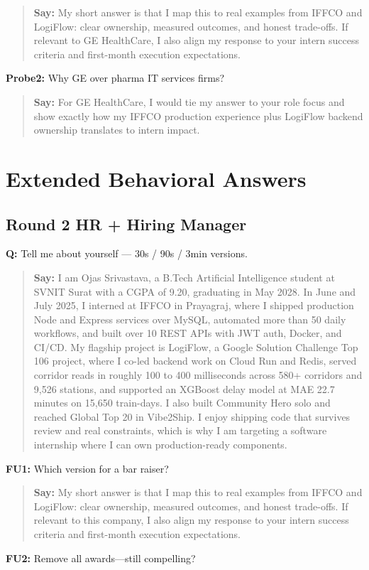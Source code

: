 \documentclass[9pt,a4paper]{article}
\begin{document}
\begin{quote}\small\textbf{Say:} My short answer is that I map this to real examples from IFFCO and LogiFlow: clear ownership, measured outcomes, and honest trade-offs. If relevant to GE HealthCare, I also align my response to your intern success criteria and first-month execution expectations.\end{quote}
\vspace{2mm}
\textbf{Probe2:} Why GE over pharma IT services firms?

\begin{quote}\small\textbf{Say:} For GE HealthCare, I would tie my answer to your role focus and show exactly how my IFFCO production experience plus LogiFlow backend ownership translates to intern impact.\end{quote}
\vspace{2mm}
\newpage\section{Extended Behavioral Answers}
\subsection{Round 2 HR + Hiring Manager}
\textbf{Q:} Tell me about yourself --- 30s / 90s / 3min versions.

\begin{quote}\small\textbf{Say:} I am Ojas Srivastava, a B.Tech Artificial Intelligence student at SVNIT Surat with a CGPA of 9.20, graduating in May 2028. In June and July 2025, I interned at IFFCO in Prayagraj, where I shipped production Node and Express services over MySQL, automated more than 50 daily workflows, and built over 10 REST APIs with JWT auth, Docker, and CI/CD. My flagship project is LogiFlow, a Google Solution Challenge Top 106 project, where I co-led backend work on Cloud Run and Redis, served corridor reads in roughly 100 to 400 milliseconds across 580+ corridors and 9,526 stations, and supported an XGBoost delay model at MAE 22.7 minutes on 15,650 train-days. I also built Community Hero solo and reached Global Top 20 in Vibe2Ship. I enjoy shipping code that survives review and real constraints, which is why I am targeting a software internship where I can own production-ready components.\end{quote}
\vspace{2mm}
\textbf{FU1:} Which version for a bar raiser?

\begin{quote}\small\textbf{Say:} My short answer is that I map this to real examples from IFFCO and LogiFlow: clear ownership, measured outcomes, and honest trade-offs. If relevant to this company, I also align my response to your intern success criteria and first-month execution expectations.\end{quote}
\vspace{2mm}
\textbf{FU2:} Remove all awards---still compelling?
\end{document}
